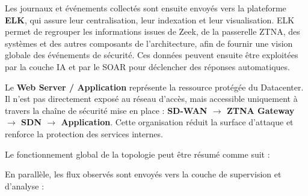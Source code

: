 \documentclass[12pt,a4paper,oneside]{report}
\begin{document}
	Les journaux et événements collectés sont ensuite envoyés vers la plateforme \textbf{ELK}, qui assure leur centralisation, leur indexation et leur visualisation. ELK permet de regrouper les informations issues de Zeek, de la passerelle ZTNA, des systèmes et des autres composants de l’architecture, afin de fournir une vision globale des événements de sécurité. Ces données peuvent ensuite être exploitées par la couche IA et par le SOAR pour déclencher des réponses automatiques.
	
	Le \textbf{Web Server / Application} représente la ressource protégée du Datacenter. Il n’est pas directement exposé au réseau d’accès, mais accessible uniquement à travers la chaîne de sécurité mise en place : \textbf{SD-WAN $\rightarrow$ ZTNA Gateway $\rightarrow$ SDN $\rightarrow$ Application}. Cette organisation réduit la surface d’attaque et renforce la protection des services internes.
	
	Le fonctionnement global de la topologie peut être résumé comme suit :
	
	\begin{center}
		\label{fig:schema-explicatif-topologie-du-datacenter}
	\end{center}
	
	En parallèle, les flux observés sont envoyés vers la couche de supervision et d’analyse :
	
	\begin{center}
		\label{fig:schema-explicatif-topologie-du-datacenter-2}
	\end{center}
	
\end{document}
